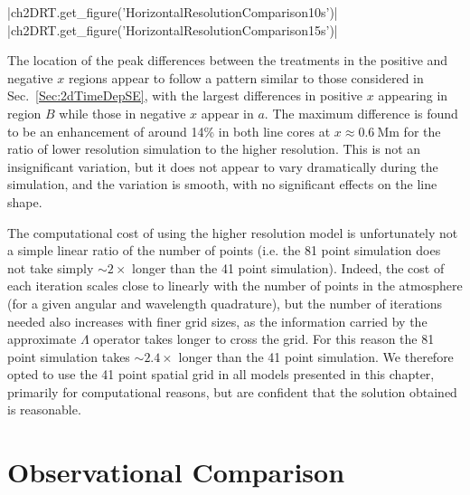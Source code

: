 \py[2DRT]|ch2DRT.get_figure('HorizontalResolutionComparison10s')|
\py[2DRT]|ch2DRT.get_figure('HorizontalResolutionComparison15s')|

The location of the peak differences between the treatments in the positive and negative $x$ regions appear to follow a pattern similar to those considered in Sec.~\ref{Sec:2dTimeDepSE}, with the largest differences in positive $x$ appearing in region $B$ while those in negative $x$ appear in $a$.
The maximum difference is found to be an enhancement of around 14\% in both line cores at $x\approx\SI{0.6}{\mega\metre}$ for the ratio of lower resolution simulation to the higher resolution.
This is not an insignificant variation, but it does not appear to vary dramatically during the simulation, and the variation is smooth, with no significant effects on the line shape.

The computational cost of using the higher resolution model is unfortunately not a simple linear ratio of the number of points (i.e. the 81 point simulation does not take simply $\sim 2\times$ longer than the 41 point simulation).
Indeed, the cost of each iteration scales close to linearly with the number of points in the atmosphere (for a given angular and wavelength quadrature), but the number of iterations needed also increases with finer grid sizes, as the information carried by the approximate $\Lambda$ operator takes longer to cross the grid.
For this reason the 81 point simulation takes $\sim 2.4\times$ longer than the 41 point simulation.
We therefore opted to use the 41 point spatial grid in all models presented in this chapter, primarily for computational reasons, but are confident that the solution obtained is reasonable.


\section{Observational Comparison}


